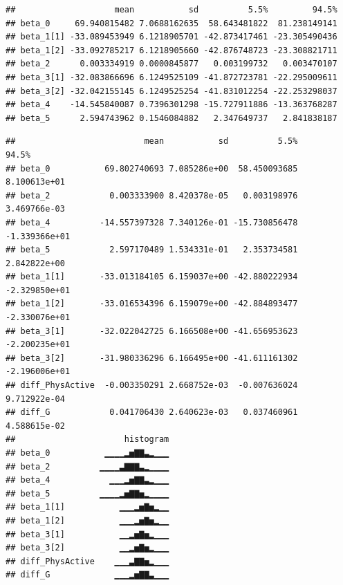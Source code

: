\documentclass[
]{book}
\newenvironment{Shaded}{\begin{snugshade}}{\end{snugshade}}
\newcommand{\AttributeTok}[1]{\textcolor[rgb]{0.13,0.29,0.53}{#1}}
\newcommand{\CommentTok}[1]{\textcolor[rgb]{0.56,0.35,0.01}{\textit{#1}}}
\newcommand{\DecValTok}[1]{\textcolor[rgb]{0.00,0.00,0.81}{#1}}
\newcommand{\FunctionTok}[1]{\textcolor[rgb]{0.13,0.29,0.53}{\textbf{#1}}}
\newcommand{\NormalTok}[1]{#1}
\newcommand{\OtherTok}[1]{\textcolor[rgb]{0.56,0.35,0.01}{#1}}
\newcommand{\SpecialCharTok}[1]{\textcolor[rgb]{0.81,0.36,0.00}{\textbf{#1}}}
\begin{document}
\begin{verbatim}
##                    mean           sd          5.5%         94.5%
## beta_0     69.940815482 7.0688162635  58.643481822  81.238149141
## beta_1[1] -33.089453949 6.1218905701 -42.873417461 -23.305490436
## beta_1[2] -33.092785217 6.1218905660 -42.876748723 -23.308821711
## beta_2      0.003334919 0.0000845877   0.003199732   0.003470107
## beta_3[1] -32.083866696 6.1249525109 -41.872723781 -22.295009611
## beta_3[2] -32.042155145 6.1249525254 -41.831012254 -22.253298037
## beta_4    -14.545840087 0.7396301298 -15.727911886 -13.363768287
## beta_5      2.594743962 0.1546084882   2.347649737   2.841838187
\end{verbatim}

\begin{Shaded}
\end{Shaded}

\begin{verbatim}
##                          mean           sd          5.5%         94.5%
## beta_0           69.802740693 7.085286e+00  58.450093685  8.100613e+01
## beta_2            0.003333900 8.420378e-05   0.003198976  3.469766e-03
## beta_4          -14.557397328 7.340126e-01 -15.730856478 -1.339366e+01
## beta_5            2.597170489 1.534331e-01   2.353734581  2.842822e+00
## beta_1[1]       -33.013184105 6.159037e+00 -42.880222934 -2.329850e+01
## beta_1[2]       -33.016534396 6.159079e+00 -42.884893477 -2.330076e+01
## beta_3[1]       -32.022042725 6.166508e+00 -41.656953623 -2.200235e+01
## beta_3[2]       -31.980336296 6.166495e+00 -41.611161302 -2.196006e+01
## diff_PhysActive  -0.003350291 2.668752e-03  -0.007636024  9.712922e-04
## diff_G            0.041706430 2.640623e-03   0.037460961  4.588615e-02
##                      histogram
## beta_0           ▁▁▁▁▂▅▇▇▃▂▁▁▁
## beta_2          ▁▁▁▁▃▇▇▇▃▂▁▁▁▁
## beta_4            ▁▁▁▂▅▇▇▃▂▁▁▁
## beta_5          ▁▁▁▁▂▅▇▇▅▂▁▁▁▁
## beta_1[1]           ▁▁▁▂▅▇▅▂▁▁
## beta_1[2]           ▁▁▁▂▅▇▅▂▁▁
## beta_3[1]           ▁▁▂▅▇▅▂▁▁▁
## beta_3[2]           ▁▁▂▅▇▅▂▁▁▁
## diff_PhysActive    ▁▁▁▃▇▇▅▂▁▁▁
## diff_G             ▁▁▁▂▅▇▇▃▁▁▁
\end{verbatim}
\end{document}
